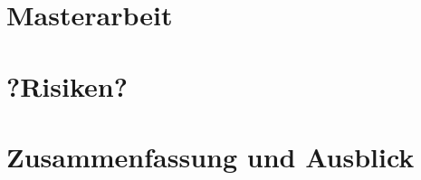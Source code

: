 \documentclass[10pt,conference,compsocconf]{IEEEtran}
\begin{document}
\section{Masterarbeit}



\section{?Risiken?}



\section{Zusammenfassung und Ausblick}





\end{document}
